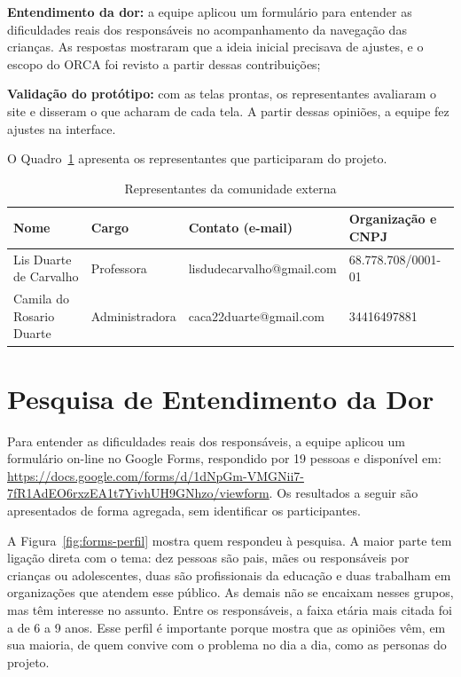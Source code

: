 \documentclass[
    12pt,           %
    oneside,        %
    a4paper,        %
    chapter=TITLE,  %
    english,        %
    brazil          %
]{abntex2}
\begin{document}
\begin{alineas}
    \item \textbf{Entendimento da dor:} a equipe aplicou um formulário para entender as dificuldades reais dos responsáveis no
    acompanhamento da navegação das crianças. As respostas mostraram que a
    ideia inicial precisava de ajustes, e o escopo do ORCA foi revisto a partir
    dessas contribuições;
    \item \textbf{Validação do protótipo:} com as telas prontas, os
    representantes avaliaram o site e disseram o que acharam de cada tela. A
    partir dessas opiniões, a equipe fez ajustes na interface.
\end{alineas}
O Quadro~\ref{tab:representantes} apresenta os representantes que
participaram do projeto.
\begin{table}[htbp]
\centering
\small
\renewcommand{\arraystretch}{1.4}
\begin{tabular}{|p{3.4cm}|p{2.5cm}|p{4.6cm}|p{3.3cm}|}
\hline
\textbf{Nome} & \textbf{Cargo} & \textbf{Contato (e-mail)} & \textbf{Organização e CNPJ} \\ \hline
Lis Duarte de Carvalho & Professora & lisdudecarvalho@\allowbreak gmail.com & 68.778.708/0001-01 \\ \hline
Camila do Rosario Duarte & Administradora & caca22duarte@\allowbreak gmail.com & 34416497881 \\ \hline
\end{tabular}
\caption{Representantes da comunidade externa}
\label{tab:representantes}
\end{table}

\section{Pesquisa de Entendimento da Dor}

Para entender as dificuldades reais dos responsáveis, a equipe aplicou um
formulário on-line no Google Forms, respondido por 19 pessoas e disponível
em:
\url{https://docs.google.com/forms/d/1dNpGm-VMGNii7-7fR1AdEO6rxzEA1t7YivhUH9GNhzo/viewform}.
Os resultados a seguir são apresentados de forma agregada, sem identificar os
participantes.

A Figura~\ref{fig:forms-perfil} mostra quem respondeu à pesquisa. A maior
parte tem ligação direta com o tema: dez pessoas são pais, mães ou
responsáveis por crianças ou adolescentes, duas são profissionais da educação
e duas trabalham em organizações que atendem esse público. As demais não se
encaixam nesses grupos, mas têm interesse no assunto. Entre os responsáveis, a
faixa etária mais citada foi a de 6 a 9 anos. Esse perfil é importante porque
mostra que as opiniões vêm, em sua maioria, de quem convive com o problema no
dia a dia, como as personas do projeto.
\end{document}
